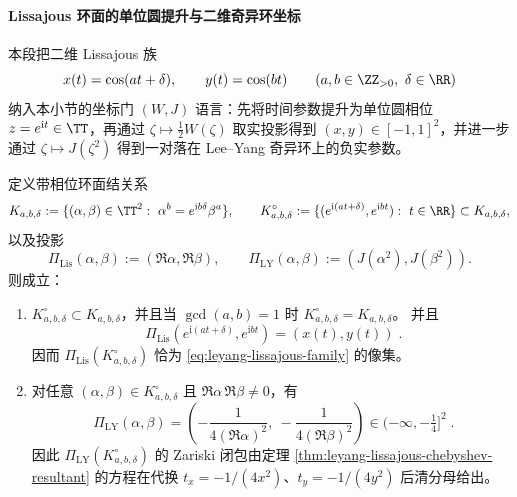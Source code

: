 

\paragraph{Lissajous 环面的单位圆提升与二维奇异环坐标}
本段把二维 Lissajous 族
\begin{equation}\label{eq:leyang-lissajous-family}
x(t)=\cos(at+\delta),\qquad y(t)=\cos(bt)
\qquad(a,b\in\ZZ_{>0},\ \delta\in\RR)
\end{equation}
纳入本小节的坐标门 \((W,J)\) 语言：先将时间参数提升为单位圆相位 \(z=e^{\mathrm{i}t}\in\TT\)，再通过 \(\zeta\mapsto \frac12W(\zeta)\) 取实投影得到 \((x,y)\in[-1,1]^2\)，并进一步通过 \(\zeta\mapsto J(\zeta^2)\) 得到一对落在 Lee--Yang 奇异环上的负实参数。

\begin{proposition}\label{prop:leyang-lissajous-unit-circle-uplift}
定义带相位环面结关系
\[
K_{a,b,\delta}:=\{(\alpha,\beta)\in\TT^2:\ \alpha^b=e^{\mathrm{i}b\delta}\beta^a\},
\qquad
K_{a,b,\delta}^{\circ}:=\{(e^{\mathrm{i}(at+\delta)},e^{\mathrm{i}bt}):\ t\in\RR\}\subset K_{a,b,\delta},
\]
以及投影
\[
\Pi_{\mathrm{Lis}}(\alpha,\beta):=(\Re\alpha,\Re\beta),\qquad
\Pi_{\mathrm{LY}}(\alpha,\beta):=(J(\alpha^2),J(\beta^2)).
\]
则成立：
\begin{enumerate}
  \item \(K_{a,b,\delta}^{\circ}\subset K_{a,b,\delta}\)，并且当 \(\gcd(a,b)=1\) 时 \(K_{a,b,\delta}^{\circ}=K_{a,b,\delta}\)。
  并且
  \begin{equation}\label{eq:leyang-lissajous-joukowsky-projection}
  \boxed{\;
  \Pi_{\mathrm{Lis}}(e^{\mathrm{i}(at+\delta)},e^{\mathrm{i}bt})
  =(x(t),y(t))\; }.
  \end{equation}
  因而 \(\Pi_{\mathrm{Lis}}(K_{a,b,\delta}^{\circ})\) 恰为 \eqref{eq:leyang-lissajous-family} 的像集。
  \item 对任意 \((\alpha,\beta)\in K_{a,b,\delta}^{\circ}\) 且 \(\Re\alpha\,\Re\beta\neq 0\)，有
  \begin{equation}\label{eq:leyang-lissajous-leyang-readout}
  \boxed{\;
  \Pi_{\mathrm{LY}}(\alpha,\beta)
  =\left(-\frac{1}{4(\Re\alpha)^2},\ -\frac{1}{4(\Re\beta)^2}\right)\in(-\infty,-\tfrac14]^2\; }.
  \end{equation}
  因此 \(\Pi_{\mathrm{LY}}(K_{a,b,\delta}^{\circ})\) 的 Zariski 闭包由定理 \ref{thm:leyang-lissajous-chebyshev-resultant} 的方程在代换 \(t_x=-1/(4x^2)\)、\(t_y=-1/(4y^2)\) 后清分母给出。
\end{enumerate}
\end{proposition}
